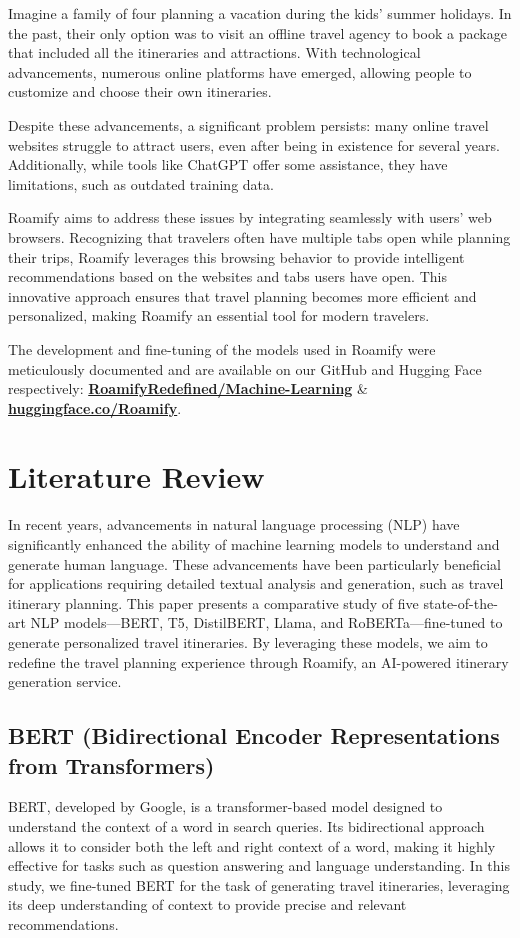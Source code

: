 \documentclass[conference]{IEEEtran}
\begin{document}
    Imagine a family of four planning a vacation during the kids' summer holidays. In the past, their only option was to visit an offline travel agency to book a package that included all the itineraries and attractions. With technological advancements, numerous online platforms have emerged, allowing people to customize and choose their own itineraries.

    Despite these advancements, a significant problem persists: many online travel websites struggle to attract users, even after being in existence for several years. Additionally, while tools like ChatGPT offer some assistance, they have limitations, such as outdated training data.

    Roamify aims to address these issues by integrating seamlessly with users' web browsers. Recognizing that travelers often have multiple tabs open while planning their trips, Roamify leverages this browsing behavior to provide intelligent recommendations based on the websites and tabs users have open. This innovative approach ensures that travel planning becomes more efficient and personalized, making Roamify an essential tool for modern travelers.

    The development and fine-tuning of the models used in Roamify were meticulously documented and are available on our GitHub and Hugging Face respectively: \href{https://github.com/RoamifyRedefined/Machine-Learning}{\textbf{RoamifyRedefined/Machine-Learning}} \& \href{https://huggingface.co/Roamify}{\textbf{huggingface.co/Roamify}}.

\section{Literature Review}

    In recent years, advancements in natural language processing (NLP) have significantly enhanced the ability of machine learning models to understand and generate human language. These advancements have been particularly beneficial for applications requiring detailed textual analysis and generation, such as travel itinerary planning. This paper presents a comparative study of five state-of-the-art NLP models—BERT, T5, DistilBERT, Llama, and RoBERTa—fine-tuned to generate personalized travel itineraries. By leveraging these models, we aim to redefine the travel planning experience through Roamify, an AI-powered itinerary generation service.

    \subsection{BERT (Bidirectional Encoder Representations from Transformers)}
        BERT, developed by Google, is a transformer-based model designed to understand the context of a word in search queries. Its bidirectional approach allows it to consider both the left and right context of a word, making it highly effective for tasks such as question answering and language understanding. In this study, we fine-tuned BERT for the task of generating travel itineraries, leveraging its deep understanding of context to provide precise and relevant recommendations.
\end{document}
